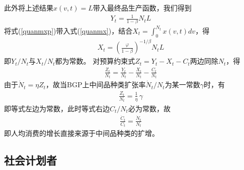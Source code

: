 \documentclass[cn,normal,11pt,black]{elegantnote}
\begin{document}
此外将上述结果$x(v,t)=L$带入最终品生产函数，我们得到
\begin{align}
    Y_t = \frac{1}{1-\beta} N_t  L
\end{align}
将式(\ref{quanmxp})带入式(\ref{quanmx})，结合$X_t=\int_0^{N_t} x(v,t) dv$，得
\begin{align}
    X_t = {\left(\frac{\varphi}{1-\beta}\right)}^{-1/\beta} N_t L
\end{align}
即$Y_t/N_t$与$X_t/N_t$都为常数。
对预算约束式$Z_t = Y_t - X_t - C_t$两边同除$N_t$，得
\begin{align}
    \frac{Z_t}{N_t} = \frac{Y_t}{N_t} - \frac{X_t}{N_t} - \frac{C_t}{N_t}
\end{align}
由于$\dot{N}_t = \eta Z_t$，故当BGP上中间品种类扩张率$\dot{N}_t/N_t$为某一常数$\gamma$时，有
\begin{align}
\frac{Z_t}{N_t} = \frac{1}{\eta} \, \gamma
\end{align}
即等式左边为常数，此时等式右边$C_t/N_t$必为常数，故
\begin{align}
\frac{\dot{C}_t}{C_t} = \frac{\dot{N}_t}{N_t}
\end{align}
即人均消费的增长直接来源于中间品种类的扩增。

\subsection{社会计划者}
\end{document}
